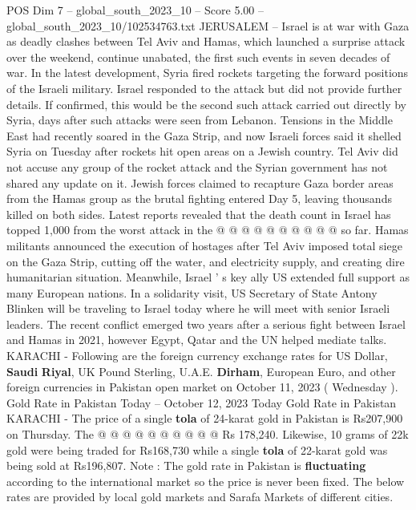 \begin{textsample}{POS Dim 7 – global\_south\_2023\_10 – Score 5.00 – global\_south\_2023\_10/102534763.txt}  \label{ex:f7_pos_133}
JERUSALEM -- Israel is at war with Gaza as deadly clashes between Tel Aviv and Hamas, which launched a surprise attack over the weekend, continue unabated, the first such events in seven decades of war.
In the latest development, Syria fired rockets targeting the forward positions of the Israeli military.
Israel responded to the attack but did not provide further details.
If confirmed, this would be the second such attack carried out directly by Syria, days after such attacks were seen from Lebanon.
Tensions in the Middle East had recently soared in the Gaza Strip, and now Israeli forces said it shelled Syria on Tuesday after rockets hit open areas on a Jewish country.
Tel Aviv did not accuse any group of the rocket attack and the Syrian government has not shared any update on it.
Jewish forces claimed to recapture Gaza border areas from the Hamas group as the brutal fighting entered Day 5, leaving thousands killed on both sides.
Latest reports revealed that the death count in Israel has topped 1,000 from the worst attack in the @ @ @ @ @ @ @ @ @ @ so far.
Hamas militants announced the execution of hostages after Tel Aviv imposed total siege on the Gaza Strip, cutting off the water, and electricity supply, and creating dire humanitarian situation.
Meanwhile, Israel ' s key ally US extended full support as many European nations.
In a solidarity visit, US Secretary of State Antony Blinken will be traveling to Israel today where he will meet with senior Israeli leaders.
The recent conflict emerged two years after a serious fight between Israel and Hamas in 2021, however Egypt, Qatar and the UN helped mediate talks.
KARACHI - Following are the foreign currency exchange rates for US Dollar, \textbf{Saudi} \textbf{Riyal}, UK Pound Sterling, U.A.E. \textbf{Dirham}, European Euro, and other foreign currencies in Pakistan open market on October 11, 2023 ( Wednesday ).
Gold Rate in Pakistan Today -- October 12, 2023 Today Gold Rate in Pakistan KARACHI - The price of a single \textbf{tola} of 24-karat gold in Pakistan is Rs207,900 on Thursday.
The @ @ @ @ @ @ @ @ @ @ Rs 178,240.
Likewise, 10 grams of 22k gold were being traded for Rs168,730 while a single \textbf{tola} of 22-karat gold was being sold at Rs196,807.
Note : The gold rate in Pakistan is \textbf{fluctuating} according to the international market so the price is never been fixed.
The below rates are provided by local gold markets and Sarafa Markets of different cities.

\end{textsample}
